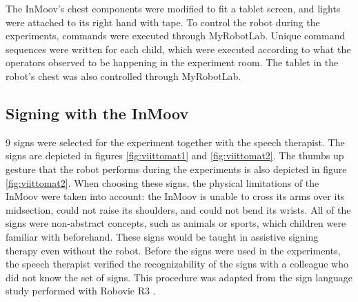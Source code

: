 The InMoov's chest components were modified to fit a tablet screen, and lights were attached to its right hand with tape. To control the robot during the experiments, commands were executed through MyRobotLab. Unique command sequences were written for each child, which were executed according to what the operators observed to be happening in the experiment room. The tablet in the robot's chest was also controlled through MyRobotLab.


\subsection{Signing with the InMoov}

9 signs were selected for the experiment together with the speech therapist. The signs are depicted in figures \ref{fig:viittomat1} and \ref{fig:viittomat2}. The thumbs up gesture that the robot performs during the experiments is also depicted in figure \ref{fig:viittomat2}. When choosing these signs, the physical limitations of the InMoov were taken into account: the InMoov is unable to cross its arms over its midsection, could not raise its shoulders, and could not bend its wrists. All of the signs were non-abstract concepts, such as animals or sports, which children were familiar with beforehand. These signs would be taught in assistive signing therapy even without the robot. Before the signs were used in the experiments, the speech therapist verified the recognizability of the signs with a colleague who did not know the set of signs. This procedure was adapted from the sign language study performed with Robovie R3 \cite{uluer2015new}.


